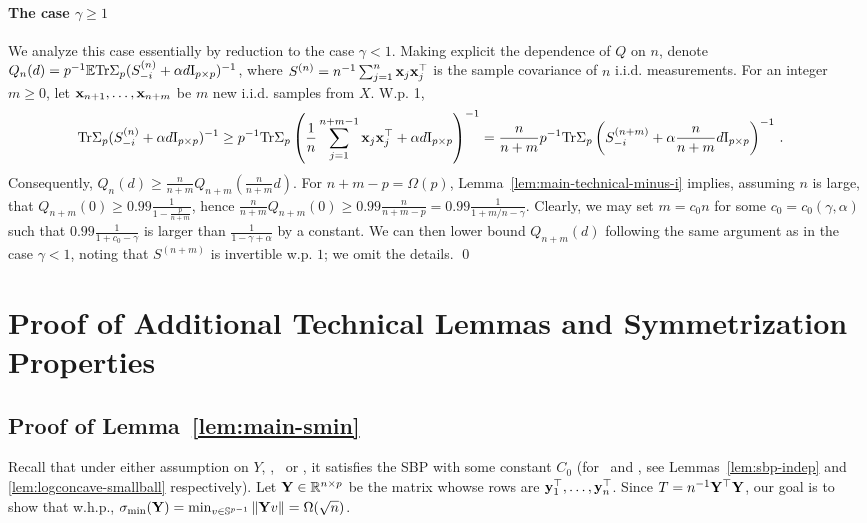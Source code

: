 \documentclass[times,sort&compress,3p]{elsarticle}
\begin{document}
\paragraph{The case $\gamma\ge 1$} 
We analyze this case
essentially by reduction 
to the case $\gamma<1$. Making explicit the dependence of $Q$ on $n$, denote $Q_n(d)=p^{-1}{\mathbb{E}}\textrm{Tr} \Sigma_p(S^{(n)}_{-i}+\alpha d \mathrm{I}_{p \times p})^{-1}$, where $S^{(n)}=n^{-1}\sum_{j=1}^n {\bf x}_j{\bf x}_j^\top$ is the sample covariance of $n$ i.i.d. measurements. 
For an integer $m\ge 0$, let ${\bf x}_{n+1},\ldots,{\bf x}_{n+m}$ be $m$ new i.i.d. samples from $X$. W.p. 1,
\begin{align*}
    \textrm{Tr} \Sigma_p(S^{(n)}_{-i}+\alpha d \mathrm{I}_{p \times p})^{-1} 
    &\ge p^{-1}\textrm{Tr} \Sigma_p\left( \frac{1}{n}\sum_{j=1}^{n+m-1}{\bf x}_j{\bf x}_j^\top + \alpha d \mathrm{I}_{p \times p} \right)^{-1} 
    = \frac{n}{n+m} p^{-1}\textrm{Tr} \Sigma_p\left( S^{(n+m)}_{-i} + \alpha \frac{n}{n+m} d \mathrm{I}_{p \times p} \right)^{-1}\,.
\end{align*}
Consequently, $Q_n(d)\ge \frac{n}{n+m}Q_{n+m}\left( \frac{n}{n+m}d \right)$. For $n+m-p=\Omega(p)$, Lemma~\ref{lem:main-technical-minus-i} implies, assuming $n$ is large, that $Q_{n+m}(0)\ge 0.99 \frac{1}{1-\frac{p}{n+m}}$, hence $\frac{n}{n+m}Q_{n+m}(0)\ge 0.99\frac{n}{n+m-p}=0.99\frac{1}{1+m/n-\gamma}$. Clearly, we may set $m=c_0 n$ for some $c_0=c_0(\gamma,\alpha)$ such that $0.99\frac{1}{1+c_0-\gamma}$ is larger than $\frac{1}{1-\gamma+\alpha}$ by a constant. We can then lower bound $Q_{n+m}(d)$ following the same argument as in the case $\gamma<1$, noting that $S^{(n+m)}$ is invertible w.p. $1$; we omit the details.
\qed


\section{Proof of Additional Technical Lemmas and Symmetrization Properties}

\subsection{Proof of Lemma~\ref{lem:main-smin}}
\label{sec:proof:lem:main-smin}

Recall that under either assumption on $Y$, \AssumIndep, \AssumCCPSB~or \AssumLC, it satisfies the SBP with some constant $C_0$ (for \AssumIndep~and \AssumLC, see Lemmas~\ref{lem:sbp-indep} and \ref{lem:logconcave-smallball} respectively). Let ${\bf Y} \in \mathbb{R}^{n\times p}$ be the matrix whowse rows are ${\bf y}_1^\top,\ldots,{\bf y}_n^\top$. Since $T=n^{-1}{\bf Y}^\top {\bf Y}$, our goal is to show that w.h.p.,
$\sigma_{\min}({\bf Y}) = \min_{v\in \mathbb{S}^{p-1}} \|{\bf Y} v\| = \Omega(\sqrt{n})$.
\end{document}

